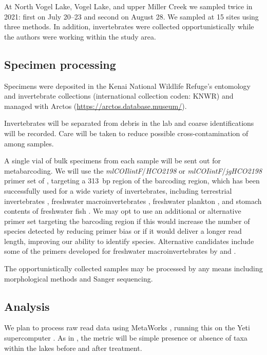At North Vogel Lake, Vogel Lake, and upper Miller Creek we sampled twice in 2021: first on July 20--23 and second on August 28. We sampled at 15 sites using three methods. In addition, invertebrates were collected opportunistically while the authors were working within the study area. 



\subsection{Specimen processing}

Specimens were deposited in the Kenai National Wildlife Refuge's entomology and invertebrate collections (international collection coden: KNWR) and managed with Arctos (\url{https://arctos.database.museum/}).

Invertebrates will be separated from debris in the lab and coarse identifications will be recorded. Care will be taken to reduce possible cross-contamination of  among samples.

A single vial of bulk specimens from each sample will be sent out for metabarcoding. We will use the \textit{mlCOIlintF}/\textit{HCO2198} or \textit{mlCOIintF}/\textit{jgHCO2198} primer set of \citet{Lerayetal2013}, targeting a 313~bp region of the   barcoding region, which has been successfully used for a wide variety of invertebrates, including terrestrial invertebrates \citep{Bowseretal2020}, freshwater macroinvertebrates \citep{Hajibabaeietal2019}, freshwater plankton \citep{Yangetal2017}, and stomach contents of freshwater fish \citep{BowserBowser2020}. We may opt to use an additional or alternative primer set targeting the   barcoding region if this would increase the number of species detected by reducing primer bias or if it would deliver a longer read length, improving our ability to identify species. Alternative candidates include some of the primers developed for freshwater macroinvertebrates by \citet{ElbrechtLeese2017} and \citet{Vamosetal2017}.

The opportunistically collected samples may be processed by any means including morphological methods and Sanger sequencing.

\subsection{Analysis}

We plan to process raw read data using MetaWorks \citep{PorterHajibabaei2020}, running this on the Yeti supercomputer \citep{USGSARC2021}. As in \citet{Massengill2014, Massengill2017}, the metric will be simple presence or absence of taxa within the lakes before and after treatment.


